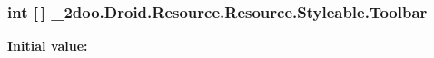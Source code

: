 \hypertarget{class__2doo_1_1_droid_1_1_resource_1_1_styleable_4e02897f43c7f7de80a07f6ff2251a81}{
\subsubsection[{Toolbar}]{\setlength{\rightskip}{0pt plus 5cm}int \mbox{[}$\,$\mbox{]} \_\-2doo.Droid.Resource.Resource.Styleable.Toolbar}}
\label{class__2doo_1_1_droid_1_1_resource_1_1_styleable_4e02897f43c7f7de80a07f6ff2251a81}


\textbf{Initial value:}


